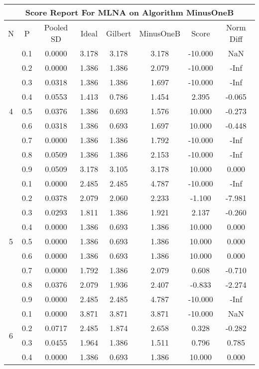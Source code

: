 \documentclass[11pt,a4paper]{report}
\begin{document}
\begin{longtable}{ | c | c || c | c | c | c | c | c | }
\hline
\multicolumn{8}{|c|}{ Score Report For MLNA on Algorithm MinusOneB} \\
\hline
N & P & Pooled SD &  Ideal &  Gilbert & MinusOneB  & Score & Norm Diff \\
 \hline
 \hline
 \endhead
\multirow{9}{*}{4} & 0.1 & 0.0000 & 3.178 & 3.178 & 3.178 & -10.000 & NaN \\
 & 0.2 & 0.0000 & 1.386 & 1.386 & 2.079 & -10.000 & -Inf \\
 & 0.3 & 0.0318 & 1.386 & 1.386 & 1.697 & -10.000 & -Inf \\
 & 0.4 & 0.0553 & 1.413 & 0.786 & 1.454 & 2.395 & -0.065 \\
 & 0.5 & 0.0376 & 1.386 & 0.693 & 1.576 & 10.000 & -0.273 \\
 & 0.6 & 0.0318 & 1.386 & 0.693 & 1.697 & 10.000 & -0.448 \\
 & 0.7 & 0.0000 & 1.386 & 1.386 & 1.792 & -10.000 & -Inf \\
 & 0.8 & 0.0509 & 1.386 & 1.386 & 2.153 & -10.000 & -Inf \\
 & 0.9 & 0.0509 & 3.178 & 3.105 & 3.178 & 10.000 & 0.000 \\
 \hline
\multirow{9}{*}{5} & 0.1 & 0.0000 & 2.485 & 2.485 & 4.787 & -10.000 & -Inf \\
 & 0.2 & 0.0378 & 2.079 & 2.060 & 2.233 & -1.100 & -7.981 \\
 & 0.3 & 0.0293 & 1.811 & 1.386 & 1.921 & 2.137 & -0.260 \\
 & 0.4 & 0.0000 & 1.386 & 0.693 & 1.386 & 10.000 & 0.000 \\
 & 0.5 & 0.0000 & 1.386 & 0.693 & 1.386 & 10.000 & 0.000 \\
 & 0.6 & 0.0000 & 1.386 & 0.693 & 1.386 & 10.000 & 0.000 \\
 & 0.7 & 0.0000 & 1.792 & 1.386 & 2.079 & 0.608 & -0.710 \\
 & 0.8 & 0.0376 & 2.079 & 1.936 & 2.407 & -0.833 & -2.274 \\
 & 0.9 & 0.0000 & 2.485 & 2.485 & 4.787 & -10.000 & -Inf \\
 \hline
\multirow{9}{*}{6} & 0.1 & 0.0000 & 3.871 & 3.871 & 3.871 & -10.000 & NaN \\
 & 0.2 & 0.0717 & 2.485 & 1.874 & 2.658 & 0.328 & -0.282 \\
 & 0.3 & 0.0455 & 1.964 & 1.386 & 1.511 & 0.796 & 0.785 \\
 & 0.4 & 0.0000 & 1.386 & 0.693 & 1.386 & 10.000 & 0.000 \\

\end{longtable}
\end{document}
